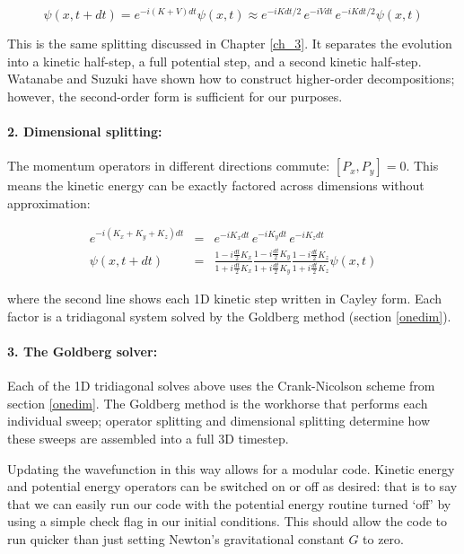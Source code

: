 \begin{equation}
\psi(x, t+dt) = e^{-i (K+V) dt} \psi(x, t) \approx e^{-i K dt/2}\, e^{-i V dt}\, e^{-i K dt/2} \psi(x, t)
\end{equation}

\noindent This is the same splitting discussed in Chapter \ref{ch_3}. It separates the evolution into a kinetic half-step, a full potential step, and a second kinetic half-step. Watanabe \citep{bib_wata} and Suzuki \citep{bib_suzu} have shown how to construct higher-order decompositions; however, the second-order form is sufficient for our purposes.

\paragraph{2. Dimensional splitting:} The momentum operators in different directions commute: $[P_x, P_y] = 0$. This means the kinetic energy can be exactly factored across dimensions without approximation:

\begin{eqnarray}
 e^{-i(K_x + K_y + K_z)dt} &=& e^{-i K_x dt}\, e^{-i K_y dt}\, e^{-i K_z dt} \nonumber \\
\psi(x, t+dt) &=& \frac{1- i\frac{dt}{2} K_x}{1+ i\frac{dt}{2} K_x} \frac{1-i\frac{dt}{2} K_y}{1+i\frac{dt}{2} K_y}\frac{1-i\frac{dt}{2} K_z}{1+i\frac{dt}{2} K_z} \psi(x, t)
\end{eqnarray}

\noindent where the second line shows each 1D kinetic step written in Cayley form. Each factor is a tridiagonal system solved by the Goldberg method (section \ref{onedim}).

\paragraph{3. The Goldberg solver:} Each of the 1D tridiagonal solves above uses the Crank-Nicolson scheme from section \ref{onedim}. The Goldberg method is the workhorse that performs each individual sweep; operator splitting and dimensional splitting determine how these sweeps are assembled into a full 3D timestep.

\noindent Updating the wavefunction in this way allows for a modular code. Kinetic energy and potential energy operators can be switched on or off as desired: that is to say that we can easily run our code with the potential energy routine turned `off' by using a simple check flag in our initial conditions. This should allow the code to run quicker than just setting Newton's gravitational constant $G$ to zero.


